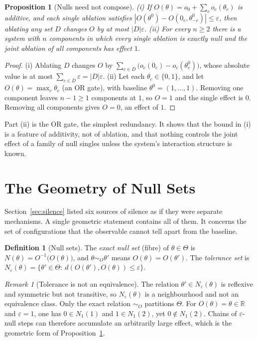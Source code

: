 \documentclass[11pt]{article}
\newtheorem{proposition}[theorem]{Proposition}
\theoremstyle{definition}
\newtheorem{definition}[theorem]{Definition}
\theoremstyle{remark}
\newtheorem{remark}[theorem]{Remark}
\newcommand{\R}{\mathbb{R}}
\begin{document}
\begin{proposition}[Nulls need not compose]\label{prop:compose}
(i) If $O(\theta)=o_0+\sum_{c}o_c(\theta_c)$ is additive, and each single ablation satisfies $|O(\theta^0)-O(0_c,\theta^0_{-c})|\le\varepsilon$, then ablating any set $D$ changes $O$ by at most $|D|\varepsilon$.
(ii) For every $n\ge 2$ there is a system with $n$ components in which every single ablation is exactly null and the joint ablation of all components has effect $1$.
\end{proposition}
\begin{proof}
(i) Ablating $D$ changes $O$ by $\sum_{c\in D}\bigl(o_c(0_c)-o_c(\theta^0_c)\bigr)$, whose absolute value is at most $\sum_{c\in D}\varepsilon=|D|\varepsilon$. (ii) Let each $\theta_c\in\{0,1\}$, and let $O(\theta)=\max_c\theta_c$ (an OR gate), with baseline $\theta^0=(1,\dots,1)$. Removing one component leaves $n-1\ge 1$ components at $1$, so $O=1$ and the single effect is $0$. Removing all components gives $O=0$, an effect of $1$.
\end{proof}

Part (ii) is the OR gate, the simplest redundancy. It shows that the bound in (i) is a feature of additivity, not of ablation, and that nothing controls the joint effect of a family of null singles unless the system's interaction structure is known.

\section{The Geometry of Null Sets}\label{sec:geometry}

Section~\ref{sec:silence} listed six sources of silence as if they were separate mechanisms. A single geometric statement contains all of them. It concerns the set of configurations that the observable cannot tell apart from the baseline.

\begin{definition}[Null sets]
The \emph{exact null set} (fibre) of $\theta\in\Theta$ is $N(\theta)=O^{-1}\bigl(O(\theta)\bigr)$, and $\theta\sim_O\theta'$ means $O(\theta)=O(\theta')$. The \emph{tolerance set} is $N_\varepsilon(\theta)=\{\theta'\in\Theta:\ d(O(\theta'),O(\theta))\le\varepsilon\}$.
\end{definition}

\begin{remark}[Tolerance is not an equivalence]
The relation $\theta'\in N_\varepsilon(\theta)$ is reflexive and symmetric but not transitive, so $N_\varepsilon(\theta)$ is a neighbourhood and not an equivalence class. Only the exact relation $\sim_O$ partitions $\Theta$. For $O(\theta)=\theta\in\R$ and $\varepsilon=1$, one has $0\in N_1(1)$ and $1\in N_1(2)$, yet $0\notin N_1(2)$. Chains of $\varepsilon$-null steps can therefore accumulate an arbitrarily large effect, which is the geometric form of Proposition~\ref{prop:compose}.
\end{remark}
\end{document}
